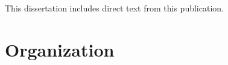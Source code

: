 This dissertation includes direct text from this publication.
\section{Organization}


















